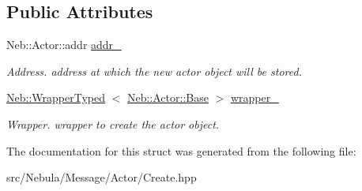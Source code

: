 \subsection*{\-Public \-Attributes}
\begin{DoxyCompactItemize}
\item 
\hypertarget{structNeb_1_1Message_1_1Actor_1_1Create_a925e9660c46a4264a84fdaad5dc79da8}{\-Neb\-::\-Actor\-::addr \hyperlink{structNeb_1_1Message_1_1Actor_1_1Create_a925e9660c46a4264a84fdaad5dc79da8}{addr\-\_\-}}\label{structNeb_1_1Message_1_1Actor_1_1Create_a925e9660c46a4264a84fdaad5dc79da8}

\begin{DoxyCompactList}\small\item\em \-Address. address at which the new actor object will be stored. \end{DoxyCompactList}\item 
\hypertarget{structNeb_1_1Message_1_1Actor_1_1Create_a6aae87ea763a64722094752017a9ba9b}{\hyperlink{classNeb_1_1WrapperTyped}{\-Neb\-::\-Wrapper\-Typed}\*
$<$ \hyperlink{classNeb_1_1Actor_1_1Base}{\-Neb\-::\-Actor\-::\-Base} $>$ \hyperlink{structNeb_1_1Message_1_1Actor_1_1Create_a6aae87ea763a64722094752017a9ba9b}{wrapper\-\_\-}}\label{structNeb_1_1Message_1_1Actor_1_1Create_a6aae87ea763a64722094752017a9ba9b}

\begin{DoxyCompactList}\small\item\em \-Wrapper. wrapper to create the actor object. \end{DoxyCompactList}\end{DoxyCompactItemize}


\-The documentation for this struct was generated from the following file\-:\begin{DoxyCompactItemize}
\item 
src/\-Nebula/\-Message/\-Actor/\-Create.\-hpp\end{DoxyCompactItemize}
